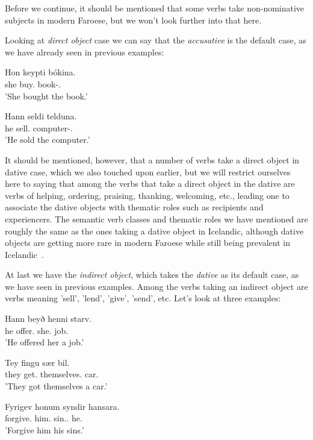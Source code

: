 \documentclass[12pt,%
    times,
]{lin-v2/lin}
\begin{document}
Before we continue, it should be mentioned that some verbs take non-nominative subjects in modern Faroese,
but we won't look further into that here.

Looking at \emph{direct object} case we can say that the \emph{accusative} is the default case,
as we have already seen in previous examples:
\begin{exe}
    \ex
    \begin{xlist}
        \item \gll Hon keypti bókina.\\
        she buy.\Pst{} book-\Det.\Acc\\
        \trans 'She bought the book.'
        \item \gll Hann seldi telduna.\\
        he sell.\Pst{} computer-\Det.\Acc\\
        \trans 'He sold the computer.'
    \end{xlist}
\end{exe}

It should be mentioned, however, that a number of verbs take a direct object in dative case, which we also touched upon earlier,
but we will restrict ourselves here to saying that among the verbs that take a direct object in the dative are
verbs of helping, ordering, praising, thanking, welcoming, etc., leading one to associate the dative objects with
thematic roles such as recipients and experiencers. The semantic verb classes and thematic roles we have mentioned are roughly
the same as the ones taking a dative object in Icelandic, although dative objects are getting more rare in modern Faroese
while still being prevalent in Icelandic~\citep[257-258]{faroese}.

At last we have the \emph{indirect object}, which takes the \emph{dative} as its default case, as we have seen in previous examples.
Among the verbs taking an indirect object are verbs meaning 'sell', 'lend', 'give', 'send', etc. Let's look at three examples:
\begin{exe}
    \ex
    \begin{xlist}
        \item \gll Hann beyð henni starv.\\
        he offer.\Pst{} she.\Dat{} job.\Acc\\
        \trans 'He offered her a job.'
        \item \gll Tey fingu sær bil.\\
        they get.\Pst{} themselves.\Dat{} car.\Acc\\
        \trans 'They got themselves a car.'
        \item \gll Fyrigev honum syndir hansara.\\
        forgive.\Imp{} him.\Dat{} sin.\Pl.\Acc{} he.\Gen\\
        \trans 'Forgive him his sins.'
    \end{xlist}
\end{exe}
\end{document}
